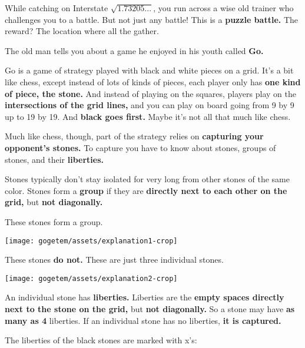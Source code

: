 

While catching \mappMobimon{} on Interstate \(\sqrt{1.73205...}\),
you run across a wise old
\mappMobimon{} trainer who challenges you to a \mappMobimon{} battle. But not
just any \mappMobimon{} battle! This is a \textbf{puzzle battle.} The reward?
The location where all the \mappMobimon{} gather.

The old man tells you about a game he enjoyed in his youth called \textbf{Go.}

Go is a game of strategy played with black and white pieces on a grid. It's a
bit like chess, except instead of lots of kinds of pieces, each player only has
\textbf{one kind of piece, the stone.} And instead of playing on the squares,
players play on the \textbf{intersections of the grid lines,} and you can play
on board going from 9 by 9 up to 19 by 19. And \textbf{black goes first.} Maybe
it's not all that much like chess.

Much like chess, though, part of the strategy relies on \textbf{capturing your
  opponent's stones.} To capture you have to know about stones, groups of
stones, and their \textbf{liberties.}

Stones typically don't stay isolated for very long from other stones of the same
color. Stones form a \textbf{group} if they are \textbf{directly next to each
  other on the grid,} but \textbf{not diagonally.}

These stones form a group.

\begin{center}
  \texttt{[image: gogetem/assets/explanation1-crop]}
\end{center}

These stones \textbf{do not.} These are just three individual stones.

\begin{center}
  \texttt{[image: gogetem/assets/explanation2-crop]}
\end{center}

An individual stone has \textbf{liberties.} Liberties are the \textbf{empty
  spaces directly next to the stone on the grid,} but \textbf{not diagonally.}
So a stone may have \textbf{as many as 4} liberties. If an individual stone has
no liberties, \textbf{it is captured.}

The liberties of the black stones are marked with x's:

